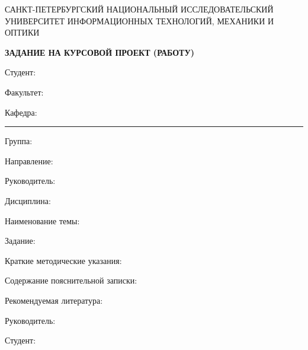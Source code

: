 \thispagestyle{empty}


\begin{center}
{\small САНКТ-ПЕТЕРБУРГСКИЙ НАЦИОНАЛЬНЫЙ ИССЛЕДОВАТЕЛЬСКИЙ УНИВЕРСИТЕТ ИНФОРМАЦИОННЫХ ТЕХНОЛОГИЙ, МЕХАНИКИ И ОПТИКИ}

\textbf{ЗАДАНИЕ НА КУРСОВОЙ ПРОЕКТ (РАБОТУ)}
\end{center}



Студент:  

Факультет: 

Кафедра: \rule{10em}{.1pt} Группа: 

Направление:  

Руководитель: 

Дисциплина: 

\hrulefill

Наименование темы: 

\hrulefill

Задание: 


\hrulefill

\hrulefill

Краткие методические указания: \hrulefill

\hrulefill

\hrulefill

\hrulefill

Содержание пояснительной записки: \hrulefill

\hrulefill

\hrulefill

\hrulefill

\hrulefill

\hrulefill

Рекомендуемая литература: \hrulefill

\hrulefill

\hrulefill

\hrulefill

Руководитель: \hrulefill

Студент: \hrulefill
